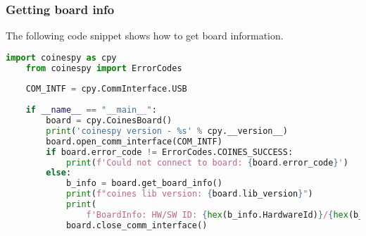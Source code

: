 \documentclass{article}
\begin{document}
\subsubsection{Getting board info}\label{GettingBoardInfo}
The following code snippet shows how to get board information.
\begin{lstlisting}[language=python]
	import coinespy as cpy
	from coinespy import ErrorCodes
	
	COM_INTF = cpy.CommInterface.USB
	
	if __name__ == "__main__":
		board = cpy.CoinesBoard()
		print('coinespy version - %s' % cpy.__version__)
		board.open_comm_interface(COM_INTF)
		if board.error_code != ErrorCodes.COINES_SUCCESS:
			print(f'Could not connect to board: {board.error_code}')
		else:
			b_info = board.get_board_info()
			print(f"coines lib version: {board.lib_version}")
			print(
				f'BoardInfo: HW/SW ID: {hex(b_info.HardwareId)}/{hex(b_info.SoftwareId)}')
			board.close_comm_interface()
\end{lstlisting}
\end{document}
